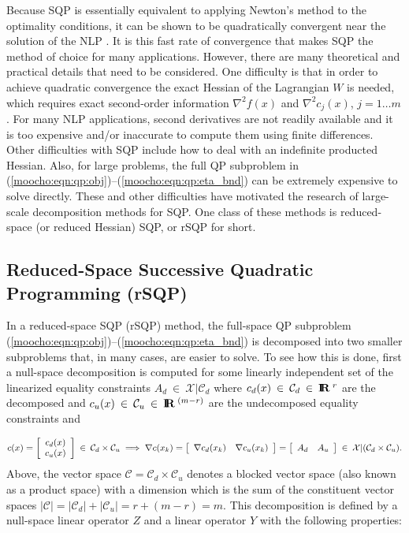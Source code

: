 \documentclass[pdf,ps2pdf,11pt]{SANDreport}
\begin{document}
{{Because SQP is essentially equivalent to applying Newton's method to the
optimality conditions, it can be shown to be quadratically convergent near the
solution of the NLP {}\cite{ref:nocedal_overton_1985}.  It is this fast rate
of convergence that makes SQP the method of choice for many applications.
However, there are many theoretical and practical details that need to be
considered.  One difficulty is that in order to achieve quadratic convergence
the exact Hessian of the Lagrangian $W$ is needed, which requires exact
second-order information $\nabla^2 f(x)$ and $\nabla^2 c_j(x)$, $j = 1 \ldots
m$.  For many NLP applications, second derivatives are not readily available
and it is too expensive and/or inaccurate to compute them using finite
differences.  Other difficulties with SQP include how to deal with an
indefinite producted Hessian.  Also, for large problems, the full QP
subproblem in (\ref{moocho:eqn:qp:obj})--(\ref{moocho:eqn:qp:eta_bnd}) can be
extremely expensive to solve directly.  These and other difficulties have
motivated the research of large-scale decomposition methods for SQP.  One
class of these methods is reduced-space (or reduced Hessian) SQP, or rSQP for
short.

%
\subsection{Reduced-Space Successive Quadratic Programming (rSQP)}
\label{moocho:sec:rSQP}
%

In a reduced-space SQP (rSQP) method, the full-space QP subproblem
(\ref{moocho:eqn:qp:obj})--(\ref{moocho:eqn:qp:eta_bnd}) is decomposed into
two smaller subproblems that, in many cases, are easier to solve.  To see how
this is done, first a null-space decomposition {}\cite[Section
18.3]{ref:nocedal_wright_1999} is computed for some linearly independent set
of the linearized equality constraints $A_d \:\in\:\mathcal{X}|\mathcal{C}_d$
where $c_d(x)\:\in\:\mathcal{C}_d\:\in\:\mbox{\textbf{I}}\hspace{-0.6ex}\mbox{\textbf{R}}\:^{r}$ are the decomposed and
$c_u(x)\:\in\:\mathcal{C}_u\:\in\:\mbox{\textbf{I}}\hspace{-0.6ex}\mbox{\textbf{R}}\:^{(m-r)}$ are the undecomposed equality
constraints and

{\bsinglespace
\begin{equation}
c(x) =
{\bmat{c} c_d(x) \\ c_u(x) \emat} \:\in\:\mathcal{C}_d \times \mathcal{C}_u
\; \Longrightarrow \;
\nabla c(x_k) = {\bmat{cc} \nabla c_d(x_k) & \nabla c_u(x_k) \emat}
= {\bmat{cc} A_d & A_u \emat} \:\in\:\mathcal{X}|(\mathcal{C}_d \times \mathcal{C}_u).
\label{moocho:eqn:lin_indep_constr}
\end{equation}
\esinglespace}
%
Above, the vector space $\mathcal{C} = \mathcal{C}_d \times \mathcal{C}_u$
denotes a blocked vector space (also known as a product space) with a
dimension which is the sum of the constituent vector spaces $|\mathcal{C}| =
|\mathcal{C}_d| + |\mathcal{C}_u| = r + (m - r) = m$.  This decomposition is
defined by a null-space linear operator $Z$ and a linear operator $Y$ with the following
properties:

}}
\end{document}
